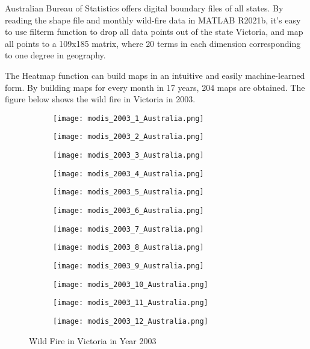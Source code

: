 \documentclass[../main]{subfiles}
\begin{document}
Australian Bureau of Statistics offers digital boundary files of all
states. By reading the shape file and monthly wild-fire data in MATLAB
R2021b, it's easy to use filterm function to drop all data points out of
the state Victoria, and map all points to a 109x185 matrix, where 20
terms in each dimension corresponding to one degree in geography.

The Heatmap function can build maps in an intuitive and easily
machine-learned form. By building maps for every month in 17 years, 204
maps are obtained. The figure below shows the wild fire in Victoria in
2003.

\begin{figure}[h!]
  \centering
\begin{subfigure}[b]{0.25\linewidth}
\texttt{[image: modis\_2003\_1\_Australia.png]}
\end{subfigure}
\begin{subfigure}[b]{0.25\linewidth}
\texttt{[image: modis\_2003\_2\_Australia.png]}
\end{subfigure}
\begin{subfigure}[b]{0.25\linewidth}
\texttt{[image: modis\_2003\_3\_Australia.png]}
\end{subfigure}
\begin{subfigure}[b]{0.25\linewidth}
\texttt{[image: modis\_2003\_4\_Australia.png]}
\end{subfigure}
\begin{subfigure}[b]{0.25\linewidth}
\texttt{[image: modis\_2003\_5\_Australia.png]}
\end{subfigure}
\begin{subfigure}[b]{0.25\linewidth}
\texttt{[image: modis\_2003\_6\_Australia.png]}
\end{subfigure}
\begin{subfigure}[b]{0.25\linewidth}
  \texttt{[image: modis\_2003\_7\_Australia.png]}
  \end{subfigure}
  \begin{subfigure}[b]{0.25\linewidth}
  \texttt{[image: modis\_2003\_8\_Australia.png]}
  \end{subfigure}
  \begin{subfigure}[b]{0.25\linewidth}
  \texttt{[image: modis\_2003\_9\_Australia.png]}
  \end{subfigure}
  \begin{subfigure}[b]{0.25\linewidth}
  \texttt{[image: modis\_2003\_10\_Australia.png]}
  \end{subfigure}
  \begin{subfigure}[b]{0.25\linewidth}
  \texttt{[image: modis\_2003\_11\_Australia.png]}
  \end{subfigure}
  \begin{subfigure}[b]{0.25\linewidth}
  \texttt{[image: modis\_2003\_12\_Australia.png]}
  \end{subfigure}
\caption{Wild Fire in Victoria in Year 2003}
  \label{fig:1-12}
\end{figure}
\end{document}
